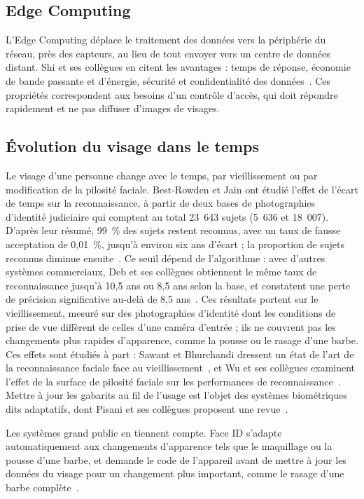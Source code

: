 \subsection{Edge Computing}

L'Edge Computing déplace le traitement des données vers la périphérie du réseau, près des capteurs, au lieu de tout envoyer vers un centre de données distant. Shi et ses collègues en citent les avantages : temps de réponse, économie de bande passante et d'énergie, sécurité et confidentialité des données~\cite{shi2016edge}. Ces propriétés correspondent aux besoins d'un contrôle d'accès, qui doit répondre rapidement et ne pas diffuser d'images de visages.

\subsection{Évolution du visage dans le temps}

Le visage d'une personne change avec le temps, par vieillissement ou par modification de la pilosité faciale. Best-Rowden et Jain ont étudié l'effet de l'écart de temps sur la reconnaissance, à partir de deux bases de photographies d'identité judiciaire qui comptent au total 23~643 sujets (5~636 et 18~007). D'après leur résumé, 99~\% des sujets restent reconnus, avec un taux de fausse acceptation de 0,01~\%, jusqu'à environ six ans d'écart ; la proportion de sujets reconnus diminue ensuite~\cite{bestrowden2018longitudinal}. Ce seuil dépend de l'algorithme : avec d'autres systèmes commerciaux, Deb et ses collègues obtiennent le même taux de reconnaissance jusqu'à 10,5 ans ou 8,5 ans selon la base, et constatent une perte de précision significative au-delà de 8,5 ans~\cite{deb2017aging}. Ces résultats portent sur le vieillissement, mesuré sur des photographies d'identité dont les conditions de prise de vue diffèrent de celles d'une caméra d'entrée ; ils ne couvrent pas les changements plus rapides d'apparence, comme la pousse ou le rasage d'une barbe. Ces effets sont étudiés à part : Sawant et Bhurchandi dressent un état de l'art de la reconnaissance faciale face au vieillissement~\cite{sawant2019aifr}, et Wu et ses collègues examinent l'effet de la surface de pilosité faciale sur les performances de reconnaissance~\cite{wu2024facialhair}. Mettre à jour les gabarits au fil de l'usage est l'objet des systèmes biométriques dits adaptatifs, dont Pisani et ses collègues proposent une revue~\cite{pisani2019adaptive}.

Les systèmes grand public en tiennent compte. Face ID s'adapte automatiquement aux changements d'apparence tels que le maquillage ou la pousse d'une barbe, et demande le code de l'appareil avant de mettre à jour les données du visage pour un changement plus important, comme le rasage d'une barbe complète~\cite{apple2026faceid}.

